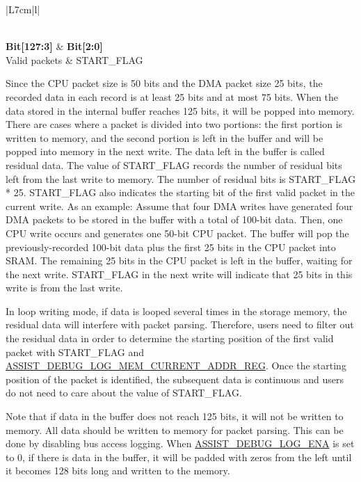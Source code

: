 \documentclass[main\_\_EN.tex]{subfiles}
\begin{document}
        \begin{longtable}[c]{|L{7cm}|l|}
        \caption{Written Data Format}\label{tab:dbgassist-written-data-format}
        \\\hline
        {\bfseries Bit[127:3]} & {\bfseries Bit[2:0]} \\\hline
        Valid packets & 
        START\_FLAG \\\hline
        \end{longtable}
        
Since the CPU packet size is 50 bits and the DMA packet size 25 bits, the recorded data in each record is at least 25 bits and at most 75 bits. When the data stored in the internal buffer reaches 125 bits, it will be popped into memory. There are cases where a packet is divided into two portions: the first portion is written to memory, and the second portion is left in the buffer and will be popped into memory in the next write. The data left in the buffer is called residual data. The value of START\_FLAG records the number of residual bits left from the last write to memory. The number of residual bits is START\_FLAG * 25. START\_FLAG also indicates the starting 
bit of the first valid packet in the current write. As an example: Assume that four DMA writes have generated four DMA packets to be stored in the buffer with a total of 100-bit data. Then, one CPU write occurs and generates one 50-bit CPU packet. The buffer will pop the previously-recorded 100-bit data plus the first 25 bits in the CPU packet into SRAM. The remaining 25 bits in the CPU packet is left in the buffer, waiting for the next write. START\_FLAG in the next write will indicate that 25 bits in this write is from the last write.

In loop writing mode, if data is looped several times in the storage memory, the residual data will interfere with packet parsing. Therefore, users need to filter out the residual data in order to determine the starting position of the first valid packet with START\_FLAG and \hyperref[regdesc:ASSISTDEBUGLOGMEMCURRENTADDRREG]{ASSIST\_DEBUG\_LOG\_MEM\_CURRENT\_ADDR\_REG}. Once the starting position of the packet is identified, the subsequent data is continuous and users do not need to care about the value of START\_FLAG.

Note that if data in the buffer does not reach 125 bits, it will not be written to memory. All data should be written to memory for packet parsing. This can be done by disabling bus access logging. When \hyperref[fielddesc:ASSISTDEBUGLOGENA]{ASSIST\_DEBUG\_LOG\_ENA} is set to 0, if there is data in the buffer, it will be padded with zeros from the left until it becomes 128 bits long and written to the memory.
\end{document}
